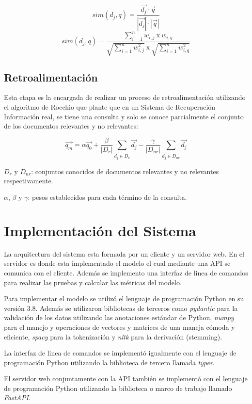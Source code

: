 \documentclass[runningheads,a4paper]{llncs}
\begin{document}
$$ sim(d_j, q) = \frac{\vec{d_j} \cdot \vec{q}}{|\vec{d_j}| \cdot |\vec{q}| } $$
$$ sim(d_j, q) = \frac{ \sum^{n}_{i=1}{w_{i,j}\ \text{x}\ w_{i,q}} }{ \sqrt{\sum^{n}_{i=1}{w_{i,j}^2}} \ \text{x}\ \sqrt{\sum^{n}_{i=1}{w_{i,q}^2}} } $$

\subsection{Retroalimentación}

Esta etapa es la encargada de realizar un proceso de retroalimentación utilizando el algoritmo de Rocchio que plante que en un Sistema de Recuperación Información real, se tiene una consulta y solo se conoce parcialmente el conjunto de los documentos relevantes y no relevantes:

$$ \vec{q_m} = \alpha \vec{q_0} + \frac{\beta}{|D_r|} \sum_{\vec{d_j} \in D_r}{\vec{d_j}} - \frac{\gamma}{|D_{nr}|} \sum_{\vec{d_j} \in D_{nr}}{\vec{d_j}} $$

$D_r$ y $D_{nr}$: conjuntos conocidos de documentos relevantes y no relevantes respectivamente.

$\alpha$, $\beta$ y $\gamma$: pesos establecidos para cada término de la consulta.

\section{Implementación del Sistema}

La arquitectura del sistema esta formada por un cliente y un servidor web. En el servidor es donde esta implementado el modelo el cual mediante una API se comunica con el cliente. Además se implemento una interfaz de linea de comandos para realizar las pruebas y calcular las métricas del modelo.

Para implementar el modelo se utilizó el lenguaje de programación Python en su versión 3.8. Además se utilizaron bibliotecas de terceros como \textit{pydantic} para la validación de los datos utilizando las anotaciones estándar de Python, \textit{numpy} para el manejo y operaciones de vectores y matrices de una maneja cómoda y eficiente, \textit{spacy} para la tokenización y \textit{nltk} para la derivación (stemming).

La interfaz de linea de comandos se implementó igualmente con el lenguaje de programación Python utilizando la biblioteca de tercero llamada \textit{typer}.

El servidor web conjuntamente con la API también se implementó con el lenguaje de programación Python utilizando la biblioteca o marco de trabajo llamado \textit{FastAPI}.
\end{document}
